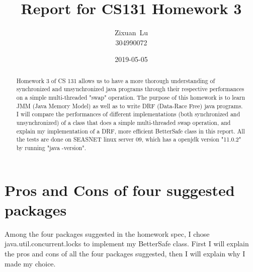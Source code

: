 \documentclass[letterpaper,twocolumn,10pt]{article}
\begin{document}

\date{2019-05-05}

\title{\Large \bf Report for CS131 Homework 3}

\author{
{\rm Zixuan\ Lu}\\
304990072 
} %

\maketitle

\begin{abstract}
Homework 3 of CS 131 allows us to have a more thorough understanding of synchronized and unsynchronized java programs through their respective performances on a simple multi-threaded "swap" operation. The purpose of this homework is to learn JMM (Java Memory Model) as well as to write DRF (Data-Race Free) java programs. I will compare the performances of different implementations (both synchronized and unsynchronized) of a class that does a simple multi-threaded swap operation, and explain my implementation of a DRF, more efficient BetterSafe class in this report. All the tests are done on SEASNET linux server 09, which has a openjdk version "11.0.2"  by running "java -version".
\end{abstract}


\section{Pros and Cons of four suggested packages}
Among the four packages suggested in the homework spec, I chose java.util.concurrent.locks to implement my BetterSafe class. First I will explain the pros and cons of all the four packages suggested, then I will explain why I made my choice.
\end{document}
